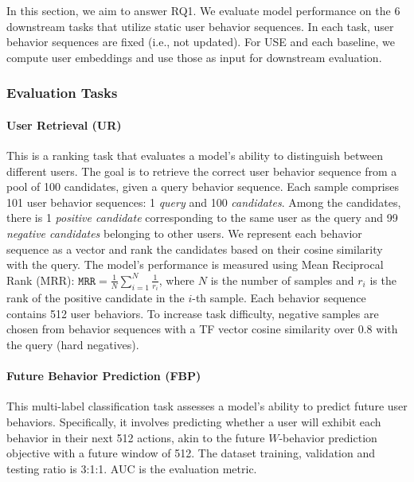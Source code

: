 \documentclass{article}
\begin{document}
\label{subsec:experiments_static}
In this section, we aim to answer RQ1. We evaluate model performance on the $6$ downstream tasks that utilize static user behavior sequences. In each task, user behavior sequences are fixed (i.e., not updated). For USE and each baseline, we compute user embeddings and use those as input for downstream evaluation.

\subsubsection{Evaluation Tasks}
\paragraph{User Retrieval (UR)}
This is a ranking task that evaluates a model's ability to distinguish between different users. The goal is to retrieve the correct user behavior sequence from a pool of 100 candidates, given a query behavior sequence. Each sample comprises 101 user behavior sequences: 1 \textit{query} and 100 \textit{candidates}. Among the candidates, there is 1 \textit{positive candidate} corresponding to the same user as the query and 99 \textit{negative candidates} belonging to other users. We represent each behavior sequence as a vector and rank the candidates based on their cosine similarity with the query. The model's performance is measured using Mean Reciprocal Rank (MRR): $\texttt{MRR} = \frac{1}{N} \sum_{i=1}^N \frac{1}{r_i}$, where $N$ is the number of samples and $r_i$ is the rank of the positive candidate in the $i$-th sample. Each behavior sequence contains 512 user behaviors. To increase task difficulty, negative samples are chosen from behavior sequences with a TF vector cosine similarity over $0.8$ with the query (hard negatives). 


\paragraph{Future Behavior Prediction (FBP)}
This multi-label classification task assesses a model's ability to predict future user behaviors. Specifically, it involves predicting whether a user will exhibit each behavior in their next 512 actions, akin to the future $W$-behavior prediction objective with a future window of 512. The dataset training, validation and testing ratio is 3:1:1. AUC is the evaluation metric.
\end{document}
